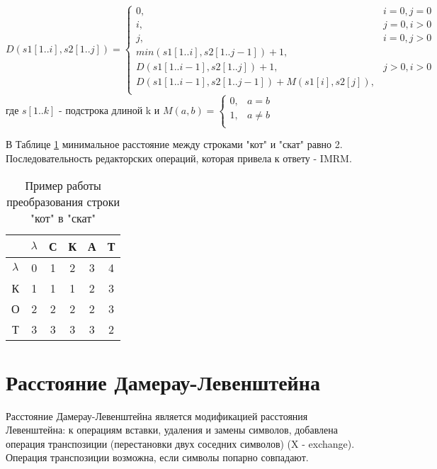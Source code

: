     \begin{equation}\label{formula:Levenshtein}
        D(s1[1..i],s2[1..j]) = \left\{ \begin{array}{ll}
            0, & \textrm{$i = 0, j = 0$}\\
            i, & \textrm{$j = 0, i > 0$}\\
            j, & \textrm{$i = 0, j > 0$}\\
           min(s1[1..i],s2[1..j-1]) + 1,\\
           D(s1[1..i-1],s2[1..j]) + 1, &\textrm{$j>0, i>0$}\\
           D(s1[1..i-1],s2[1..j-1]) + M(s1[i], s2[j]),\\
        \end{array} \right.
    \end{equation}
    где $s[1..k]$ - подстрока длиной k и 
    $M(a, b) = \left\{ \begin{array}{ll}
        0, & \textrm{$a = b$}\\
        1, & \textrm{$a \ne b$}\\
    \end{array} \right.$

    В Таблице \ref{table:example:Levenshtein} минимальное расстояние между
    строками "кот" и "скат" равно 2. Последовательность редакторских операций,
    которая привела к ответу - IMRM.

    \begin{table}[h]
        \caption{Пример работы преобразования строки "кот" в "скат"}
        \centering
        \begin{tabular}{|c|c|c|c|c|c|}
        \hline
  & $\lambda$ & С & К & А & Т \\ \hline
$\lambda$ & 0 & 1 & 2 & 3 & 4 \\ \hline
        К & 1 & 1 & 1 & 2 & 3 \\ \hline
        О & 2 & 2 & 2 & 2 & 3 \\ \hline
        Т & 3 & 3 & 3 & 3 & \cellcolor[HTML]{FFCCC9}2 \\ \hline
        \end{tabular}
        \label{table:example:Levenshtein}
    \end{table}

    \section{Расстояние Дамерау-Левенштейна}  
    Расстояние Дамерау-Левенштейна является модификацией расстояния Левенштейна:
    к операциям вставки, удаления и замены символов, добавлена операция транспозиции (перестановки
    двух соседних символов) (X - exchange). Операция транспозиции возможна, если символы попарно совпадают.

